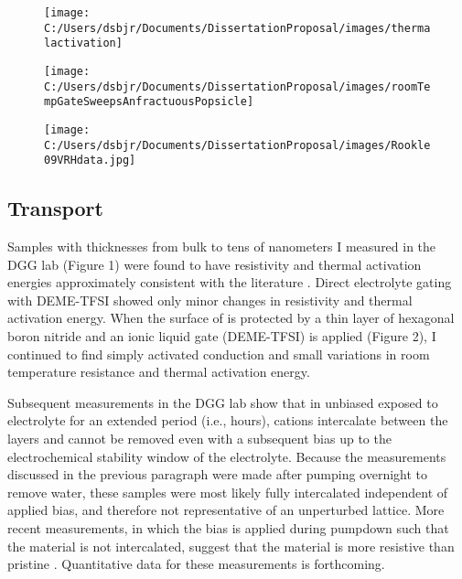 \documentclass[11pt]{article}
\begin{document}
\begin{figure}
\centering
\centering 
  {\texttt{[image: C:/Users/dsbjr/Documents/DissertationProposal/images/thermalactivation]}\label{fig:f2}}
  \captionsetup{width=0.5\textwidth}
\end{figure}
\begin{figure}
\centering
  {\texttt{[image: C:/Users/dsbjr/Documents/DissertationProposal/images/roomTempGateSweepsAnfractuousPopsicle]}\label{fig:f3}}
  \captionsetup{width=0.5\textwidth}
\end{figure}
\begin{figure}
\centering
	{\texttt{[image: C:/Users/dsbjr/Documents/DissertationProposal/images/Rookle09VRHdata.jpg]}\label{fig:f4}}
	\captionsetup{width=0.5\textwidth}
\end{figure}

\subsection{Transport}

Samples with thicknesses from bulk to tens of nanometers I measured in the DGG lab (Figure 1) were found to have resistivity and thermal activation energies approximately consistent with the literature \cite{Rojas1983}. Direct electrolyte gating with DEME-TFSI showed only minor changes in resistivity and thermal activation energy. When the surface of \rucl is protected by a thin layer of hexagonal boron nitride and an ionic liquid gate (DEME-TFSI) is applied (Figure 2), I continued to find simply activated conduction and small variations in room temperature resistance and thermal activation energy.

Subsequent measurements in the DGG lab show that in unbiased \rucl exposed to electrolyte for an extended period (i.e., hours), cations intercalate between the layers and cannot be removed even with a subsequent bias up to the electrochemical stability window of the electrolyte. Because the measurements discussed in the previous paragraph were made after pumping overnight to remove water, these samples were most likely fully intercalated independent of applied bias, and therefore not representative of an unperturbed lattice. More recent measurements, in which the bias is applied during pumpdown such that the material is not intercalated, suggest that the material is more resistive than pristine \ruclnospace. Quantitative data for these measurements is forthcoming.
\end{document}
